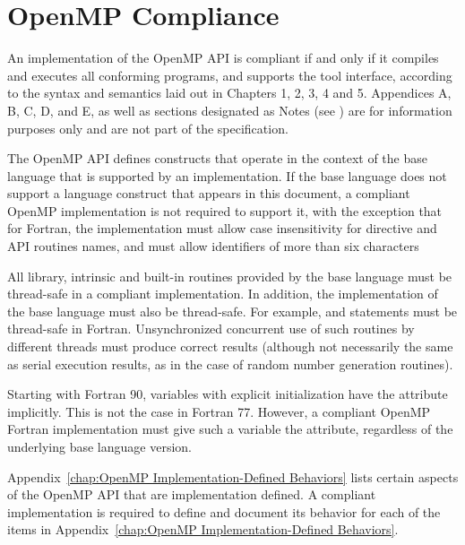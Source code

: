 \section{OpenMP Compliance}
\label{sec:OpenMP Compliance}
An implementation of the OpenMP API is compliant if and only if it compiles and
executes all conforming programs, and supports the tool interface,
according to the syntax and semantics laid out in 
Chapters 1, 2, 3, 4 and 5. 
Appendices A, B, C, D, and E, as well as sections designated as Notes 
(see ) 
are for information purposes only and are not part of the 
specification.

The OpenMP API defines constructs that operate in the context of the base language that 
is supported by an implementation. If the base language does not support a language 
construct that appears in this document, a compliant OpenMP implementation is not 
required to support it, with the exception that for Fortran, the implementation must 
allow case insensitivity for directive and API routines names, and must allow identifiers 
of more than six characters

All library, intrinsic and built-in routines provided by the base language must be
thread-safe in a compliant implementation. In addition, the implementation of the base 
language must also be thread-safe. For example,  and  
statements must be thread-safe in Fortran. Unsynchronized concurrent use of such 
routines by different threads must produce correct results (although not necessarily the 
same as serial execution results, as in the case of random number generation routines).

Starting with Fortran 90, variables with explicit initialization have the  attribute 
implicitly. This is not the case in Fortran 77. However, a compliant OpenMP Fortran 
implementation must give such a variable the  attribute, regardless of the 
underlying base language version.

Appendix~\ref{chap:OpenMP Implementation-Defined Behaviors} 
lists certain aspects of the OpenMP API that are implementation defined. A 
compliant implementation is required to define and document its behavior for each of 
the items in Appendix~\ref{chap:OpenMP Implementation-Defined Behaviors}.






